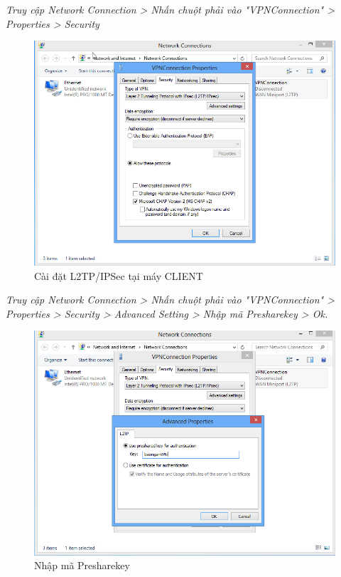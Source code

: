 \begin{itemize}
    \textit{Truy cập Network Connection > Nhấn chuột phải vào "VPNConnection" > Properties > Security}
    \begin{figure}[htbp]
        \centering
        \includegraphics[width=0.5\linewidth]{coreRemoteAccess/setKey.png}
        \caption{Cài đặt L2TP/IPSec tại máy CLIENT}
    \end{figure}
    \newpage
    \textit{Truy cập Network Connection > Nhấn chuột phải vào "VPNConnection" > Properties > Security > Advanced Setting > Nhập mã Presharekey > Ok.}
    \begin{figure}[htbp]
        \centering
        \includegraphics[width=0.5\linewidth]{coreRemoteAccess/setL2TP.png}
        \caption{Nhập mã Presharekey}
    \end{figure}

    \newpage
\end{itemize}

